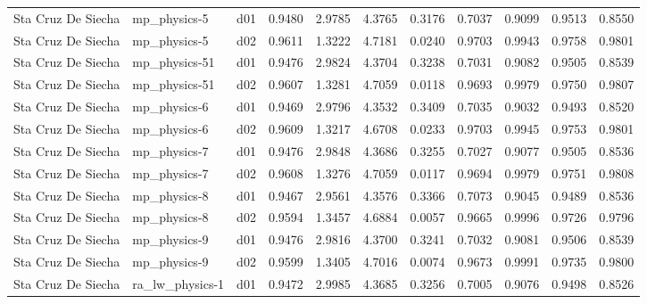 \begin{longtable}{lllrrrrrrrr}
   Sta Cruz De Siecha  &          mp\_physics-5 &     d01 &   0.9480 &   2.9785 &   4.3765 &       0.3176 &        0.7037 &       0.9099 &           0.9513 &  0.8550 \\
   Sta Cruz De Siecha  &          mp\_physics-5 &     d02 &   0.9611 &   1.3222 &   4.7181 &       0.0240 &        0.9703 &       0.9943 &           0.9758 &  0.9801 \\
   Sta Cruz De Siecha  &         mp\_physics-51 &     d01 &   0.9476 &   2.9824 &   4.3704 &       0.3238 &        0.7031 &       0.9082 &           0.9505 &  0.8539 \\
   Sta Cruz De Siecha  &         mp\_physics-51 &     d02 &   0.9607 &   1.3281 &   4.7059 &       0.0118 &        0.9693 &       0.9979 &           0.9750 &  0.9807 \\
   Sta Cruz De Siecha  &          mp\_physics-6 &     d01 &   0.9469 &   2.9796 &   4.3532 &       0.3409 &        0.7035 &       0.9032 &           0.9493 &  0.8520 \\
   Sta Cruz De Siecha  &          mp\_physics-6 &     d02 &   0.9609 &   1.3217 &   4.6708 &       0.0233 &        0.9703 &       0.9945 &           0.9753 &  0.9801 \\
   Sta Cruz De Siecha  &          mp\_physics-7 &     d01 &   0.9476 &   2.9848 &   4.3686 &       0.3255 &        0.7027 &       0.9077 &           0.9505 &  0.8536 \\
   Sta Cruz De Siecha  &          mp\_physics-7 &     d02 &   0.9608 &   1.3276 &   4.7059 &       0.0117 &        0.9694 &       0.9979 &           0.9751 &  0.9808 \\
   Sta Cruz De Siecha  &          mp\_physics-8 &     d01 &   0.9467 &   2.9561 &   4.3576 &       0.3366 &        0.7073 &       0.9045 &           0.9489 &  0.8536 \\
   Sta Cruz De Siecha  &          mp\_physics-8 &     d02 &   0.9594 &   1.3457 &   4.6884 &       0.0057 &        0.9665 &       0.9996 &           0.9726 &  0.9796 \\
   Sta Cruz De Siecha  &          mp\_physics-9 &     d01 &   0.9476 &   2.9816 &   4.3700 &       0.3241 &        0.7032 &       0.9081 &           0.9506 &  0.8539 \\
   Sta Cruz De Siecha  &          mp\_physics-9 &     d02 &   0.9599 &   1.3405 &   4.7016 &       0.0074 &        0.9673 &       0.9991 &           0.9735 &  0.9800 \\
   Sta Cruz De Siecha  &       ra\_lw\_physics-1 &     d01 &   0.9472 &   2.9985 &   4.3685 &       0.3256 &        0.7005 &       0.9076 &           0.9498 &  0.8526 \\

\end{longtable}
